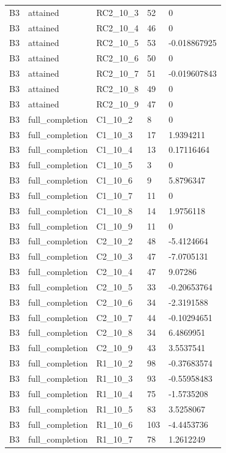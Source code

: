 \begin{longtable}{lllll}
B3 & attained & RC2\_10\_3 & 52 & 0 \\
B3 & attained & RC2\_10\_4 & 46 & 0 \\
B3 & attained & RC2\_10\_5 & 53 & -0.018867925 \\
B3 & attained & RC2\_10\_6 & 50 & 0 \\
B3 & attained & RC2\_10\_7 & 51 & -0.019607843 \\
B3 & attained & RC2\_10\_8 & 49 & 0 \\
B3 & attained & RC2\_10\_9 & 47 & 0 \\
B3 & full\_completion & C1\_10\_2 & 8 & 0 \\
B3 & full\_completion & C1\_10\_3 & 17 & 1.9394211 \\
B3 & full\_completion & C1\_10\_4 & 13 & 0.17116464 \\
B3 & full\_completion & C1\_10\_5 & 3 & 0 \\
B3 & full\_completion & C1\_10\_6 & 9 & 5.8796347 \\
B3 & full\_completion & C1\_10\_7 & 11 & 0 \\
B3 & full\_completion & C1\_10\_8 & 14 & 1.9756118 \\
B3 & full\_completion & C1\_10\_9 & 11 & 0 \\
B3 & full\_completion & C2\_10\_2 & 48 & -5.4124664 \\
B3 & full\_completion & C2\_10\_3 & 47 & -7.0705131 \\
B3 & full\_completion & C2\_10\_4 & 47 & 9.07286 \\
B3 & full\_completion & C2\_10\_5 & 33 & -0.20653764 \\
B3 & full\_completion & C2\_10\_6 & 34 & -2.3191588 \\
B3 & full\_completion & C2\_10\_7 & 44 & -0.10294651 \\
B3 & full\_completion & C2\_10\_8 & 34 & 6.4869951 \\
B3 & full\_completion & C2\_10\_9 & 43 & 3.5537541 \\
B3 & full\_completion & R1\_10\_2 & 98 & -0.37683574 \\
B3 & full\_completion & R1\_10\_3 & 93 & -0.55958483 \\
B3 & full\_completion & R1\_10\_4 & 75 & -1.5735208 \\
B3 & full\_completion & R1\_10\_5 & 83 & 3.5258067 \\
B3 & full\_completion & R1\_10\_6 & 103 & -4.4453736 \\
B3 & full\_completion & R1\_10\_7 & 78 & 1.2612249 \\

\end{longtable}
